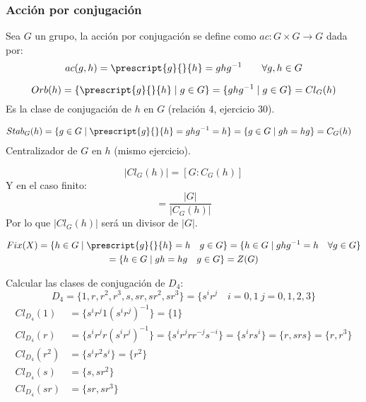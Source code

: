 \subsubsection{Acción por conjugación}
\noindent
Sea $G$ un grupo, la acción por conjugación se define como $ac:G\times G\to G$ dada por:
\begin{equation*}
    ac(g,h) = \prescript{g}{}{h} = ghg^{-1} \qquad \forall g,h\in G
\end{equation*}

\begin{equation*}
    Orb(h) = \{\prescript{g}{}{h} \mid g\in G\} = \{ghg^{-1}\mid g\in G\} = Cl_G(h)
\end{equation*}
Es la clase de conjugación de $h$ en $G$ (relación 4, ejercicio 30).

\begin{align*}
    Stab_G(h) &= \{g\in G \mid \prescript{g}{}{h} = ghg^{-1} = h\} = \{g \in G \mid gh = hg\} = C_G(h)
\end{align*}
Centralizador de $G$ en $h$ (mismo ejercicio).

\begin{equation*}
    |Cl_G(h)| = [G:C_G(h)]
\end{equation*}
Y en el caso finito:
\begin{equation*}
    [G:C_G(h)] = \dfrac{|G|}{|C_G(h)|}
\end{equation*}
Por lo que $|Cl_G(h)|$ será un divisor de $|G|$.

\begin{multline*}
    Fix(X) = \{h\in G \mid \prescript{g}{}{h} = h \quad g\in G\} = \{h\in G \mid ghg^{-1}=h \quad \forall g\in G\} \\ = \{h\in G\mid gh = hg \quad g\in G\} = Z(G)
\end{multline*}

\begin{ejemplo}
    Calcular las clases de conjugación de $D_4$:
    \begin{equation*}
        D_4 = \{1,r,r^2, r^3, s, sr, sr^2, sr^3\} = \{s^i r^j \quad i = 0,1\ j = 0,1,2,3\}
    \end{equation*}
    \begin{align*}
        Cl_{D_4}(1) &= \{s^ir^j 1 {(s^i r^j)}^{-1}\} = \{1\} \\
        Cl_{D_4}(r) &= \{s^ir^j r {(s^i r^j)}^{-1}\} = \{s^i r^j rr^{-j}s^{-i}\} = \{s^i r s^{i}\} = \{r, srs\} = \{r,r^3\} \\ %
        Cl_{D_4}(r^2) &= \{s^i r^2 s^i\} = \{r^2\} \\
        Cl_{D_4}(s) &= \{s,sr^2\} \\
        Cl_{D_4}(sr) &= \{sr,sr^3\} 
    \end{align*}
\end{ejemplo}

